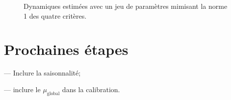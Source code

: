\documentclass[a4paper, 11pt]{article}
\begin{document}
\begin{figure}[ht]
 \centering
  
 \caption{Dynamiques estimées avec un jeu de paramètres mimisant la norme 1 des quatre critères.}
 
 \label{fig:all}
\end{figure}


\section{Prochaines étapes}

--- Inclure la saisonnalité;

--- inclure le $\mu_{\text{global}}$ dans la calibration.


\clearpage
 

\end{document}
